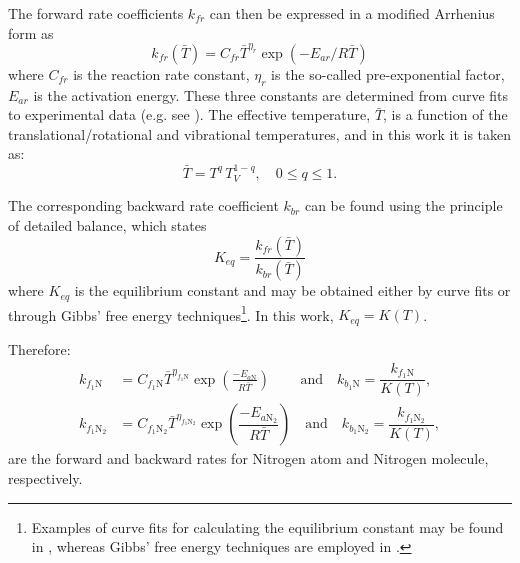 \documentclass[10pt]{article}
\begin{document}
The forward rate coefficients  $k_{fr}$  can then be expressed in a modified Arrhenius form as
\begin{equation}\label{eq:equilibrium_constant}
  k_{fr}\left(\bar{T}\right) = C_{fr} \bar{T}^{\eta_r} \exp \left(-E_{ar}/R\bar{T}\right)
\end{equation}
where $C_{fr}$ is the reaction rate constant, $\eta_r$ is the so-called pre-exponential factor, $E_{ar}$ is the activation energy.  These three constants are determined from curve fits to experimental data (e.g. see \cite{Ait1996}). The effective temperature, $\bar{T}$, is a function of the translational/rotational and vibrational temperatures, and in this work it is taken as:
\begin{equation}
	\label{eq:Tbar}
\bar{T}=T^{q} \, T_V^{1-q}, \quad 0\leq q\leq 1 .
\end{equation}


The corresponding backward rate coefficient   $k_{br}$  can be found using the principle of detailed balance, which states
\begin{equation}
  K_{eq} = \frac{k_{fr}\left(\bar{T}\right)}{k_{br}\left(\bar{T}\right)}
\end{equation}
where $K_{eq}$ is the equilibrium constant and may be obtained either by curve fits or through Gibbs' free energy techniques\footnote{Examples of curve fits for calculating the equilibrium constant may be found in \citet{Park1990}, whereas Gibbs' free energy techniques are employed in \citet{Nasa_chemistry}. }. 
In this work, $K_{eq}=K(T)$.


Therefore:
\begin{equation}
 \begin{split}
\label{eq:forward_rates1}
k_{f_1 \text{N}} &= C_{f_1 \text{N}} \bar{T}^{\eta_{f_1 \text{N}}} \exp\left(\frac{-E_{a\text{N}}}{R \bar{T}}\right) \qquad \,\mbox{and}\quad k_{b_1 \text{N}} = \dfrac{k_{f_1 \text{N}}}{K(T)},\\
%
k_{f_1 \text{N}_2} &= C_{f_1 \text{N}_2} \bar{T}^{\eta_{f_1 \text{N}_2}} \exp\left(\dfrac{-E_{a\text{N}_2}}{R \bar{T}}\right) \quad \mbox{and}\quad k_{b_1 \text{N}_2} = \dfrac{k_{f_1 \text{N}_2}}{K(T)},
%
 \end{split}
\end{equation}
are the forward and backward rates for Nitrogen atom and Nitrogen molecule, respectively.
\end{document}
